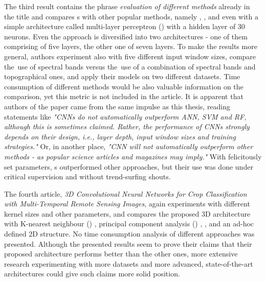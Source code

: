 The third result contains the phrase \textit{evaluation of different methods} already in the title and compares s with other popular  methods, namely , , and even with a simple  architecture called multi-layer perceptron () \cite{mlp} with a hidden layer of 30 neurons. Even the  approach is diversified into two architectures - one of them comprising of five layers, the other one of seven layers. To make the results more general, authors experiment also with five different input window sizes, compare the~use of spectral bands versus the~use of a combination of spectral bands and topographical ones, and apply their models on two different datasets. Time consumption of different methods would be also valuable information on the comparison, yet this metric is not included in the article. It is apparent that authors of the paper came from the same impulse as this thesis, reading statements like \textit{"CNNs do not automatically outperform ANN, SVM and RF, although this is sometimes claimed. Rather, the performance of CNNs strongly depends on their design, i.e., layer depth, input window sizes and training strategies."} Or, in another place, \textit{"CNN will not automatically outperform other methods - as popular science articles and magazines may imply."} With felicitously set parameters, s outperformed other approaches, but their use was done under critical supervision and without trend-surfing shouts.

The fourth article, \textit{3D Convolutional Neural Networks for Crop Classification with Multi-Temporal Remote Sensing Images}, again experiments with different kernel sizes and other parameters, and compares the proposed 3D  architecture with K-nearest neighbour () \cite{knn}, principal component analysis () \cite{pca}, , and an ad-hoc defined 2D  structure. No time consumption analysis of different approaches was presented. Although the presented results seem to prove their claims that their proposed architecture performs better than the other ones, more extensive research experimenting with more datasets and more advanced, state-of-the-art architectures could give such claims more solid position.


